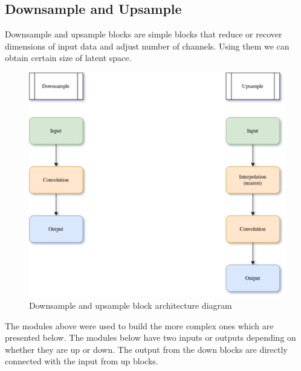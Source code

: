 \documentclass[11pt,a4paper]{report}
\begin{document}
\subsection{Downsample and Upsample}
Downsample and upsample blocks are simple blocks that reduce or recover dimensions of input data and adjust number of channels. Using them we can obtain certain size of latent space.
\begin{figure}[H]
	\centering
	\includegraphics[scale=0.6]{images/UpDownSample.drawio}
    \caption{Downsample and upsample block architecture diagram}
\end{figure}

The modules above were used to build the more complex ones which are presented below. The modules below have two inputs or outputs depending on whether they are up or down. The output from the down blocks are directly connected with the input from up blocks.
\end{document}
